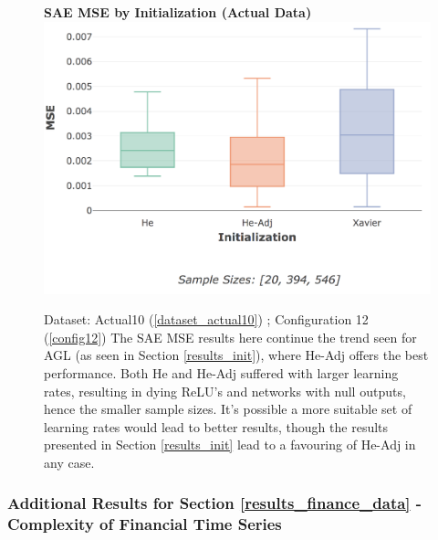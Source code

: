 \documentclass[a4paper,11pt,oneside]{article}
\theoremstyle{plain}
\theoremstyle{definition}
\begin{document}
	\begin{figure}[H]
		\centering 
		\textbf{SAE MSE by Initialization (Actual Data)} 
		\includegraphics[scale=0.3]{images/results/8_appendix/actual_mse_init.png}
		\caption[SAE MSE by Initialization (Actual Data)]{Dataset: Actual10 (\ref{dataset_actual10}) ; Configuration 12 (\ref{config12})
			\newline The SAE MSE results here continue the trend seen for AGL (as seen in Section \ref{results_init}), where He-Adj offers the best performance. Both He and He-Adj suffered with larger learning rates, resulting in dying ReLU's and networks with null outputs, hence the smaller sample sizes. It's possible a more suitable set of learning rates would lead to better results, though the results presented in Section \ref{results_init} lead to a favouring of He-Adj in any case.}
		\label{figure-actual_mse_init}
	\end{figure}
	
	\subsubsection{Additional Results for Section \ref{results_finance_data} - Complexity of Financial Time Series}\label{results_appendix_finance_data}
	
\end{document}
